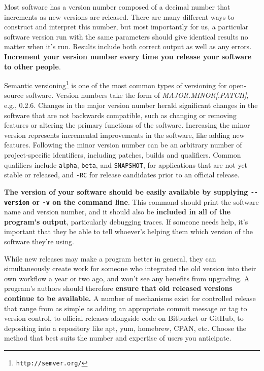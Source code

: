\documentclass[10pt,letterpaper]{article}
\newcommand{\withurl}[2]{{#1}\footnote{\texttt{#2}}}
\begin{document}
Most software has a version number composed of a decimal number that
increments as new versions are released. 
There are many different ways
to construct and interpret this number, but most importantly for us, a
particular software version run with the same parameters should give
identical results no matter when it's run. Results include both correct
output as well as any errors.
\textbf{Increment your version number every time you release your software to
other people}.

\withurl{Semantic versioning}{http://semver.org/} is one of the most common
types of versioning for open-source software. Version numbers take the
form of \emph{MAJOR.MINOR{[}.PATCH{]}}, e.g., 0.2.6.
Changes in the major
version number herald significant changes in the software that are not
backwards compatible, such as changing or removing features or altering
the primary functions of the software. Increasing the minor version
represents incremental improvements in the software, like adding new
features. Following the minor version number can be an arbitrary number
of project-specific identifiers, including patches, builds and qualifiers.
Common qualifiers include \texttt{alpha}, \texttt{beta}, and \texttt{SNAPSHOT},
for applications that are
not yet stable or released, and \texttt{-RC} for release candidates prior
to an official release.

\textbf{The version of your software should be easily available by 
supplying \texttt{-\/-version} or \texttt{-v} on the command line}. This command should print
the software name and version number, and it should
also be \textbf{included in all of the program's output}, particularly debugging
traces.  If someone needs help, it's important that they be able to tell
whoever's helping them which version of the software they're using.

While new releases may make a program better in general,
they can simultaneously create work for someone
who integrated the old version into their own workflow a year or two ago,
and won't see any benefits from upgrading.
A program's authors should therefore \textbf{ensure that old released versions
continue to be available.}
A number of mechanisms exist for
controlled release that range from as simple as adding an appropriate
commit message or tag to version control, to official releases alongside
code on Bitbucket or GitHub, to depositing into a
repository like apt, yum, homebrew, CPAN, etc. Choose the method that
best suits the number and expertise of users you anticipate.
\end{document}
